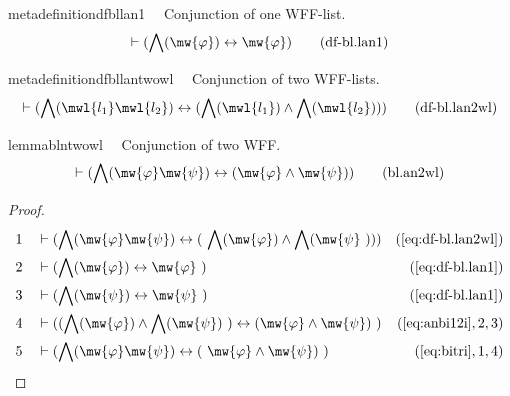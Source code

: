 \begin{restatable}{metadefinition}{dfbllan1}~~ Conjunction of one WFF-list.
\begin{align}
\vdash ( \bigwedge( \mw{\varphi} ) \leftrightarrow \mw{\varphi}
    )\label{eq:df-bl.lan1}\tag{df-bl.lan1}
\end{align}
\end{restatable}

\begin{restatable}{metadefinition}{dfbllantwowl}~~ Conjunction of two WFF-lists.
\begin{align}
\vdash ( \bigwedge( \mwl{l_1} \mwl{l_2} ) \leftrightarrow ( \bigwedge(
    \mwl{l_1} ) \wedge \bigwedge( \mwl{l_2} ) )
    )\label{eq:df-bl.lan2wl}\tag{df-bl.lan2wl}
\end{align}
\end{restatable}

\begin{restatable}{lemma}{blntwowl}~~ Conjunction of two WFF.
\begin{align}
\vdash ( \bigwedge( \mw{\varphi} \mw{\psi} ) \leftrightarrow ( \mw{\varphi}
    \wedge \mw{\psi} ) )\label{eq:bl.an2wl}\tag{bl.an2wl}
\end{align}
\end{restatable}

\begin{proof}
\begin{align}
  1 &&  & \vdash ( \bigwedge( \mw{\varphi} \mw{\psi} ) \leftrightarrow (
     ~\bigwedge( \mw{\varphi} ) \wedge \bigwedge( \mw{\psi}
     ~) ) )&(\mbox{\ref{eq:df-bl.lan2wl}})\notag
  \\ 2 &&  & \vdash ( \bigwedge( \mw{\varphi} ) \leftrightarrow \mw{\varphi}
     ~)&(\mbox{\ref{eq:df-bl.lan1}})\notag
  \\ 3 &&  & \vdash ( \bigwedge( \mw{\psi} ) \leftrightarrow \mw{\psi}
     ~)&(\mbox{\ref{eq:df-bl.lan1}})\notag
  \\ 4 &&  & \vdash ( ( \bigwedge( \mw{\varphi} ) \wedge \bigwedge( \mw{\psi} )
     ~) \leftrightarrow ( \mw{\varphi} \wedge \mw{\psi} )
     ~)&(\mbox{\ref{eq:anbi12i}},2,3)\notag
  \\ 5 &&  & \vdash ( \bigwedge( \mw{\varphi} \mw{\psi} ) \leftrightarrow (
     ~\mw{\varphi} \wedge \mw{\psi} )
     ~)&(\mbox{\ref{eq:bitri}},1,4)\notag
\end{align}
\end{proof}

